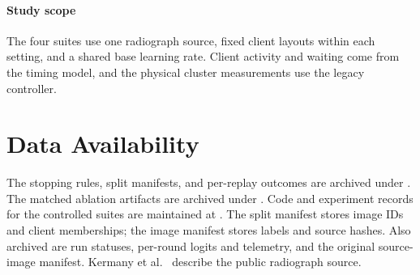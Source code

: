 \documentclass[conference]{IEEEtran}
\begin{document}
\paragraph{Study scope}
The four suites use one radiograph source, fixed client layouts within each setting, and a shared base learning rate. Client activity and waiting come from the timing model, and the physical cluster measurements use the legacy controller.

\section*{Data Availability}\label{sec:data}
The stopping rules, split manifests, and per-replay outcomes are archived under . The matched ablation artifacts are archived under . Code and experiment records for the controlled suites are maintained at . The split manifest stores image IDs and client memberships; the image manifest stores labels and source hashes. Also archived are run statuses, per-round logits and telemetry, and the original source-image manifest. Kermany et al.~\cite{kermany2018} describe the public radiograph source.
\end{document}
